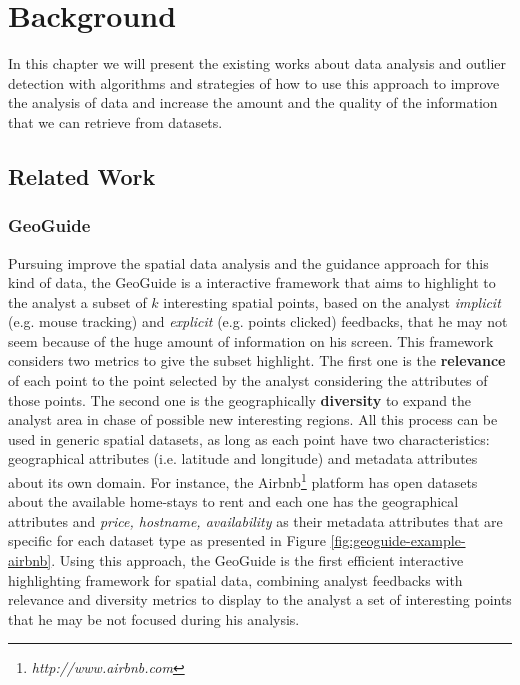 \chapter{Background}

In this chapter we will present the existing works about data analysis and
outlier detection with algorithms and strategies of how to use this approach to
improve the analysis of data and increase the amount and the quality of the
information that we can retrieve from datasets.

\section{Related Work}

\subsection{GeoGuide}

Pursuing improve the spatial data analysis and the guidance approach for this kind of data, the GeoGuide \cite{omidvarTehrani2017} is a interactive framework that aims to highlight to the analyst a subset of $k$ interesting spatial points, based on the analyst \textit{implicit} (e.g. mouse tracking) and \textit{explicit} (e.g. points clicked) feedbacks, that he may not seem because of the huge amount of information on his screen. This framework considers two metrics to give the subset highlight. The first one is the \textbf{relevance} of each point to the point selected by the analyst considering the attributes of those points. The second one is the geographically \textbf{diversity} to expand the analyst area in chase of possible new interesting regions. All this process can be used in generic spatial datasets, as long as each point have two characteristics: geographical attributes (i.e. latitude and longitude) and metadata attributes about its own domain. For instance, the Airbnb\footnote{\it http://www.airbnb.com} platform has open datasets about the available home-stays to rent and each one has the geographical attributes and \textit{price, hostname, availability} as their metadata attributes that are specific for each dataset type as presented in Figure \ref{fig:geoguide-example-airbnb}. Using this approach, the GeoGuide is the first efficient interactive highlighting framework for spatial data, combining analyst feedbacks with relevance and diversity metrics to display to the analyst a set of interesting points that he may be not focused during his analysis.

